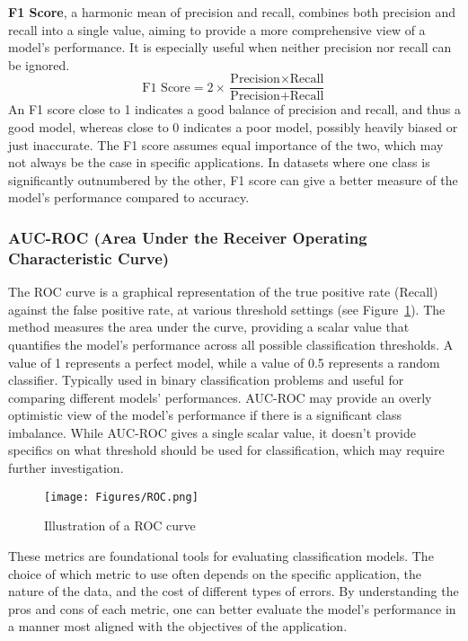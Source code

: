 \textbf{F1 Score}, a harmonic mean of precision and recall, combines both precision and recall into a single value, aiming to provide a more comprehensive view of a model's performance. It is especially useful when neither precision nor recall can be ignored. 
\begin{equation*}
\text{F1 Score} = 2 \times \frac{\text{Precision} \times \text{Recall}}{\text{Precision} + \text{Recall}} 
\end{equation*}
An F1 score close to 1 indicates a good balance of precision and recall, and thus a good model, whereas close to 0 indicates a poor model, possibly heavily biased or just inaccurate. The F1 score assumes equal importance of the two, which may not always be the case in specific applications. In datasets where one class is significantly outnumbered by the other, F1 score can give a better measure of the model's performance compared to accuracy.

\subsubsection{AUC-ROC (Area Under the Receiver Operating Characteristic Curve)}

The ROC curve is a graphical representation of the true positive rate (Recall) against the false positive rate, at various threshold settings (see Figure~\ref{Fig:Roc}). The method measures the area under the curve, providing a scalar value that quantifies the model's performance across all possible classification thresholds. A value of 1 represents a perfect model, while a value of 0.5 represents a random classifier. Typically used in binary classification problems and useful for comparing different models' performances. AUC-ROC may provide an overly optimistic view of the model's performance if there is a significant class imbalance. While AUC-ROC gives a single scalar value, it doesn't provide specifics on what threshold should be used for classification, which may require further investigation.

\begin{figure}[ht!]
	\begin{center}
		\texttt{[image: Figures/ROC.png]}
	\end{center}
	\caption{Illustration of a ROC curve~\cite{ROC}}
	\label{Fig:Roc}
\end{figure} 


These metrics are foundational tools for evaluating classification models. The choice of which metric to use often depends on the specific application, the nature of the data, and the cost of different types of errors. By understanding the pros and cons of each metric, one can better evaluate the model's performance in a manner most aligned with the objectives of the application.


